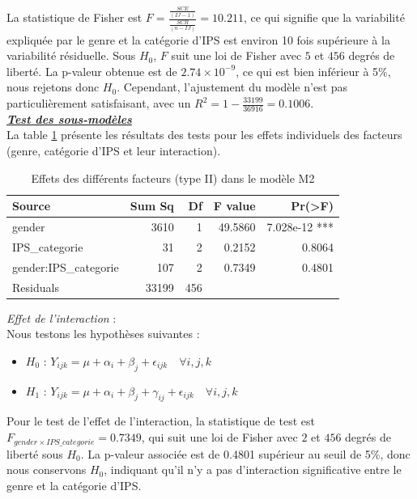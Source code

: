 \documentclass[12pt,a4paper]{article}
\begin{document}
\begin{enumerate}[label=\textbf{\alph*})]
	La statistique de Fisher est $F = \frac{\frac{SCE}{(IJ - 1)}}{\frac{SCR}{(n - IJ)}} = 10.211$, ce qui signifie que la variabilité expliquée par le genre et la catégorie d'IPS est environ 10 fois supérieure à la variabilité résiduelle. Sous $H_0$, $F$ suit une loi de Fisher avec $5$ et $456$ degrés de liberté. La p-valeur obtenue est de $2.74 \times 10^{-9}$, ce qui est bien inférieur à 5\%, nous rejetons donc $H_0$. Cependant, l'ajustement du modèle n'est pas particulièrement satisfaisant, avec un $R^2 = 1 - \frac{33199}{36916} = 0.1006$. \\
	
	\noindent
	\textbf{\textit{\underline{Test des sous-modèles}}}  \\
	
	La table \ref{tab:anova_results3} présente les résultats des tests pour les effets individuels des facteurs (genre, catégorie d'IPS et leur interaction).
	
	\begin{table}[H]
		\centering
		\caption{Effets des différents facteurs (type II) dans le modèle M2}
		\begin{tabular}{lrrrr}
			\toprule
			Source & Sum Sq & Df & F value & Pr(>F) \\ 
			\midrule
			gender                & 3610   & 1  & 49.5860 & 7.028e-12 *** \\ 
			IPS\_categorie        & 31     & 2  & 0.2152  & 0.8064    \\ 
			gender:IPS\_categorie & 107    & 2  & 0.7349  & 0.4801    \\ 
			Residuals             & 33199  & 456 &         &           \\ 
			\bottomrule
		\end{tabular}
		\label{tab:anova_results3}
	\end{table}
	
	\noindent
	\textit{Effet de l'interaction} : \\
	Nous testons les hypothèses suivantes :
	\begin{itemize}[label=--, leftmargin=*]
		\item \textbf{$H_0$} : $Y_{ijk} = \mu + \alpha_i + \beta_j + \epsilon_{ijk} \quad \forall i,j,k$ 
		\item \textbf{$H_1$} : $Y_{ijk} = \mu + \alpha_i + \beta_j + \gamma_{ij} + \epsilon_{ijk} \quad \forall i,j,k$
	\end{itemize}
	
	Pour le test de l'effet de l'interaction, la statistique de test est $F_{gender \times IPS\_categorie} = 0.7349$, qui suit une loi de Fisher avec $2$ et $456$ degrés de liberté sous $H_0$. La p-valeur associée est de 0.4801 supérieur au seuil de 5\%, donc nous conservons $H_0$, indiquant qu'il n'y a pas d'interaction significative entre le genre et la catégorie d'IPS. \\
	

\end{enumerate}
\end{document}
